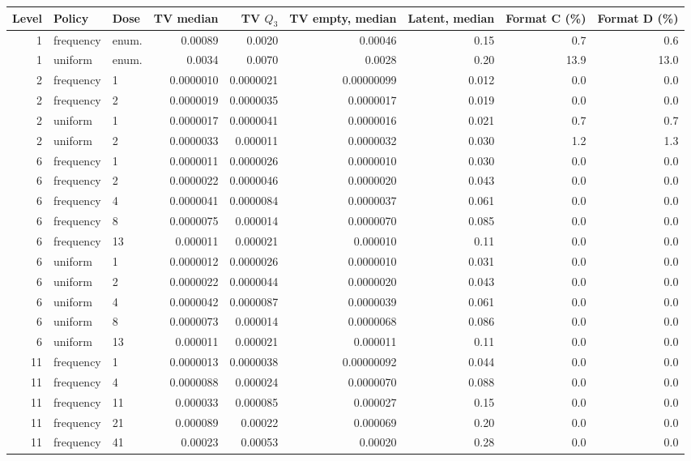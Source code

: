 \begin{tabular}{rllrrrrrr}
\toprule
Level & Policy & Dose & TV median & TV $Q_3$ & TV empty, median & Latent, median & Format C (\%) & Format D (\%) \\
\midrule
1 & frequency & enum. & 0.00089 & 0.0020 & 0.00046 & 0.15 & 0.7 & 0.6 \\
1 & uniform & enum. & 0.0034 & 0.0070 & 0.0028 & 0.20 & 13.9 & 13.0 \\
2 & frequency & 1 & 0.0000010 & 0.0000021 & 0.00000099 & 0.012 & 0.0 & 0.0 \\
2 & frequency & 2 & 0.0000019 & 0.0000035 & 0.0000017 & 0.019 & 0.0 & 0.0 \\
2 & uniform & 1 & 0.0000017 & 0.0000041 & 0.0000016 & 0.021 & 0.7 & 0.7 \\
2 & uniform & 2 & 0.0000033 & 0.000011 & 0.0000032 & 0.030 & 1.2 & 1.3 \\
6 & frequency & 1 & 0.0000011 & 0.0000026 & 0.0000010 & 0.030 & 0.0 & 0.0 \\
6 & frequency & 2 & 0.0000022 & 0.0000046 & 0.0000020 & 0.043 & 0.0 & 0.0 \\
6 & frequency & 4 & 0.0000041 & 0.0000084 & 0.0000037 & 0.061 & 0.0 & 0.0 \\
6 & frequency & 8 & 0.0000075 & 0.000014 & 0.0000070 & 0.085 & 0.0 & 0.0 \\
6 & frequency & 13 & 0.000011 & 0.000021 & 0.000010 & 0.11 & 0.0 & 0.0 \\
6 & uniform & 1 & 0.0000012 & 0.0000026 & 0.0000010 & 0.031 & 0.0 & 0.0 \\
6 & uniform & 2 & 0.0000022 & 0.0000044 & 0.0000020 & 0.043 & 0.0 & 0.0 \\
6 & uniform & 4 & 0.0000042 & 0.0000087 & 0.0000039 & 0.061 & 0.0 & 0.0 \\
6 & uniform & 8 & 0.0000073 & 0.000014 & 0.0000068 & 0.086 & 0.0 & 0.0 \\
6 & uniform & 13 & 0.000011 & 0.000021 & 0.000011 & 0.11 & 0.0 & 0.0 \\
11 & frequency & 1 & 0.0000013 & 0.0000038 & 0.00000092 & 0.044 & 0.0 & 0.0 \\
11 & frequency & 4 & 0.0000088 & 0.000024 & 0.0000070 & 0.088 & 0.0 & 0.0 \\
11 & frequency & 11 & 0.000033 & 0.000085 & 0.000027 & 0.15 & 0.0 & 0.0 \\
11 & frequency & 21 & 0.000089 & 0.00022 & 0.000069 & 0.20 & 0.0 & 0.0 \\
11 & frequency & 41 & 0.00023 & 0.00053 & 0.00020 & 0.28 & 0.0 & 0.0 \\

\end{tabular}
